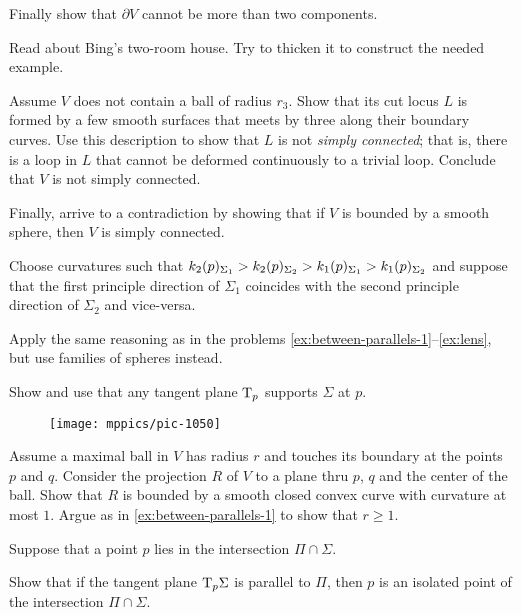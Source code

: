 Finally show that $\partial V$ cannot be more than two components.

Read about Bing's two-room house.
Try to thicken it to construct the needed example.

Assume $V$ does not contain a ball of radius $r_3$.
Show that its cut locus $L$ is formed by a few smooth surfaces that meets by three along their boundary curves.
Use this description to show that $L$ is not \emph{simply connected}; that is, there is a loop in $L$ that cannot be deformed continuously to a trivial loop.
Conclude that $V$ is not simply connected.

Finally, arrive to a contradiction by showing that if $V$ is bounded by a smooth sphere, then $V$ is simply connected. 

\setcounter{eqtn}{0}

Choose curvatures such that 
$k_2(p)_{\Sigma_1}\z>k_2(p)_{\Sigma_2}> k_1(p)_{\Sigma_1}> k_1(p)_{\Sigma_2}$ and suppose that the first principle direction of $\Sigma_1$ coincides with the second principle direction of $\Sigma_2$ and vice-versa.

 Apply the same reasoning as in the problems \ref{ex:between-parallels-1}--\ref{ex:lens}, but use families of spheres instead.


 Show and use that any tangent plane $\mathrm{T}_p$ supports $\Sigma$ at $p$.

{

\begin{wrapfigure}{r}{25 mm}
\vskip-8mm
\centering
\texttt{[image: mppics/pic-1050]}
\vskip-0mm
\end{wrapfigure}

Assume a maximal ball in $V$ has radius $r$ and touches its boundary at the points $p$ and $q$.
Consider the projection $R$ of $V$ to a plane thru $p$, $q$ and the center of the ball.
Show that $R$ is bounded by a smooth closed convex curve with curvature at most $1$.
Argue as in \ref{ex:between-parallels-1} to
show that $r\ge 1$.

}
 

Suppose that a point $p$ lies in the intersection $\Pi\cap\Sigma$.

Show that if the tangent plane $\mathrm{T}_p\Sigma$ is parallel to $\Pi$,
then $p$ is an isolated point of the intersection $\Pi\cap\Sigma$.

